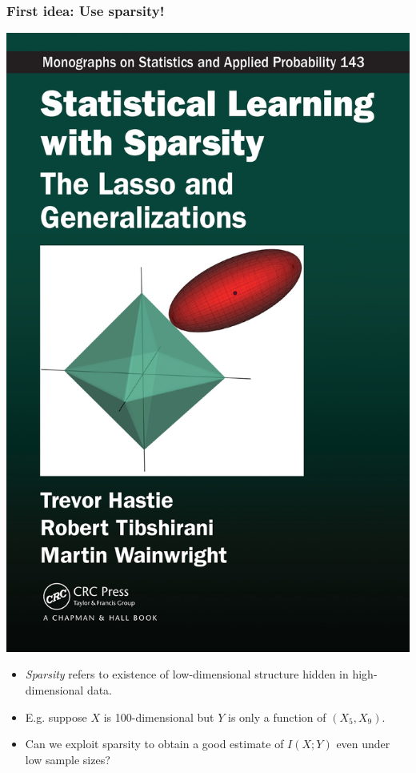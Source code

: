 \documentclass{beamer}
\begin{document}
\begin{frame}
\frametitle{First idea: Use sparsity!}
\begin{center}
\includegraphics[scale = 0.05]{sls.jpg}
\end{center}
\begin{itemize}
\item \emph{Sparsity} refers to existence of low-dimensional structure hidden in high-dimensional data.\pause
\item E.g. suppose $X$ is 100-dimensional but $Y$ is only a function of $(X_5, X_9)$.\pause
\item Can we exploit sparsity to obtain a good estimate of $I(X; Y)$ even under low sample sizes?
\end{itemize}
\end{frame}
\end{document}
